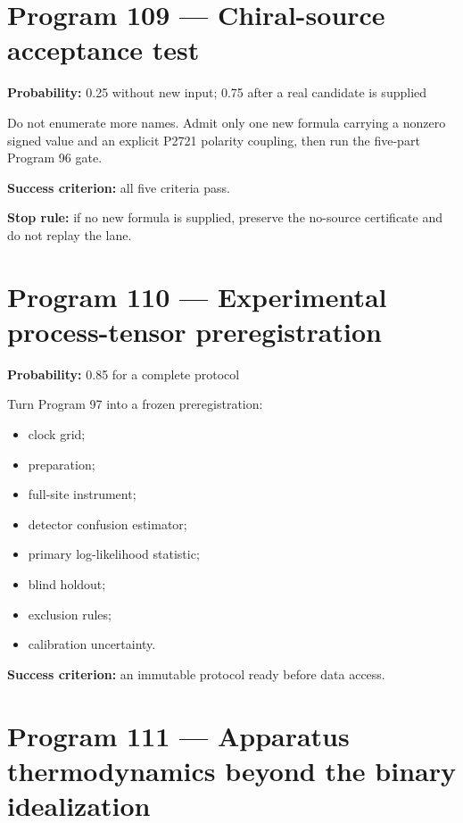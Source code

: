\documentclass[11pt,a4paper,openany]{report}
\begin{document}
\section{Program 109 --- Chiral-source acceptance test}

\textbf{Probability:} 0.25 without new input; 0.75 after a real candidate is supplied

Do not enumerate more names. Admit only one new formula carrying a nonzero signed value and an explicit P2721 polarity coupling, then run the five-part Program 96 gate.

\textbf{Success criterion:} all five criteria pass.

\textbf{Stop rule:} if no new formula is supplied, preserve the no-source certificate and do not replay the lane.

\section{Program 110 --- Experimental process-tensor preregistration}

\textbf{Probability:} 0.85 for a complete protocol

Turn Program 97 into a frozen preregistration:

\begin{itemize}
\item 
clock grid;

\item 
preparation;

\item 
full-site instrument;

\item 
detector confusion estimator;

\item 
primary log-likelihood statistic;

\item 
blind holdout;

\item 
exclusion rules;

\item 
calibration uncertainty.

\end{itemize}

\textbf{Success criterion:} an immutable protocol ready before data access.

\section{Program 111 --- Apparatus thermodynamics beyond the binary idealization}
\end{document}
